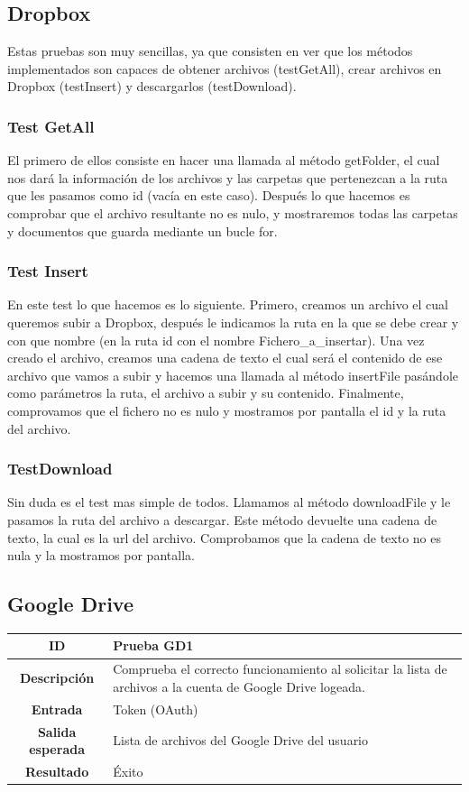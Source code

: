 \documentclass{scrartcl}
\begin{document}
\subsection{Dropbox}
Estas pruebas son muy sencillas, ya que consisten en ver que los métodos implementados son capaces de obtener archivos (testGetAll), crear archivos en Dropbox (testInsert) y descargarlos (testDownload).

\subsubsection{Test GetAll}
El primero de ellos consiste en hacer una llamada al método getFolder, el cual nos dará la información de los archivos y las carpetas que pertenezcan a la ruta que les pasamos como id (vacía en este caso). Después lo que hacemos es comprobar que el archivo resultante no es nulo, y mostraremos todas las carpetas y documentos que guarda mediante un bucle for.

\subsubsection{Test Insert}
En este test lo que hacemos es lo siguiente. Primero, creamos un archivo el cual queremos subir a Dropbox, después le indicamos la ruta en la que se debe crear y con que nombre (en la ruta id con el nombre Fichero\_a\_insertar). Una vez creado el archivo, creamos una cadena de texto el cual será el contenido de ese archivo que vamos a subir y hacemos una llamada al método insertFile pasándole como parámetros la ruta, el archivo a subir y su contenido. Finalmente, comprovamos que el fichero no es nulo y mostramos por pantalla el id y la ruta del archivo.

\subsubsection{TestDownload}
Sin duda es el test mas simple de todos. Llamamos al método downloadFile y le pasamos la ruta del archivo a descargar. Este método devuelte una cadena de texto, la cual es la url del archivo. Comprobamos que la cadena de texto no es nula y la mostramos por pantalla.

\subsection{Google Drive}
\begin{tabularx}{14cm}{|c|X|}
	\hline \textbf{ID} & Prueba GD1 \\ 
	\hline \textbf{Descripción} & Comprueba el correcto funcionamiento al solicitar la lista de archivos a la cuenta de Google Drive logeada. \\	 
	\hline  \textbf{Entrada}		& Token (OAuth) \\ 
	\hline  \textbf{Salida esperada}			& Lista de archivos del Google Drive del usuario \\
	\hline  \textbf{Resultado}			& Éxito	 \\
	\hline 
\end{tabularx} 
\\
\\
\end{document}
